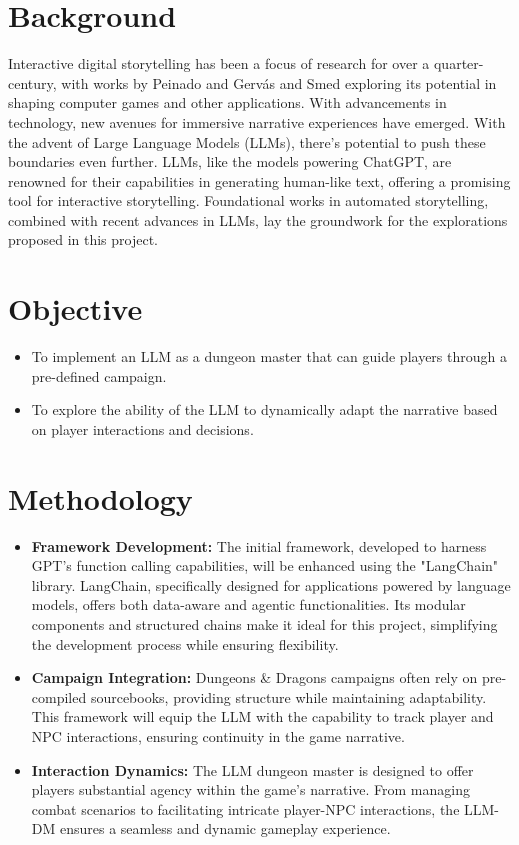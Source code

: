 \documentclass[12pt]{article}
\begin{document}
\section{Background}
Interactive digital storytelling has been a focus of research for over a quarter-century, with works by Peinado and Gervás \cite{Peinado2007AutomaticDO} and Smed \cite{Smed2014InteractiveSA} exploring its potential in shaping computer games and other applications. With advancements in technology, new avenues for immersive narrative experiences have emerged. With the advent of Large Language Models (LLMs), there's potential to push these boundaries even further. LLMs, like the models powering ChatGPT, are renowned for their capabilities in generating human-like text, offering a promising tool for interactive storytelling. Foundational works in automated storytelling, combined with recent advances in LLMs, lay the groundwork for the explorations proposed in this project.

\section{Objective}
\begin{itemize}
    \item To implement an LLM as a dungeon master that can guide players through a pre-defined campaign.
    \item To explore the ability of the LLM to dynamically adapt the narrative based on player interactions and decisions.
\end{itemize}

\section{Methodology}
\begin{itemize}
    \item \textbf{Framework Development:} The initial framework, developed to harness GPT's function calling capabilities, will be enhanced using the "LangChain" library. LangChain, specifically designed for applications powered by language models, offers both data-aware and agentic functionalities. Its modular components and structured chains make it ideal for this project, simplifying the development process while ensuring flexibility.
    \item \textbf{Campaign Integration:} Dungeons \& Dragons campaigns often rely on pre-compiled sourcebooks, providing structure while maintaining adaptability. This framework will equip the LLM with the capability to track player and NPC interactions, ensuring continuity in the game narrative.
    \item \textbf{Interaction Dynamics:} The LLM dungeon master is designed to offer players substantial agency within the game's narrative. From managing combat scenarios to facilitating intricate player-NPC interactions, the LLM-DM ensures a seamless and dynamic gameplay experience.
\end{itemize}
\end{document}
